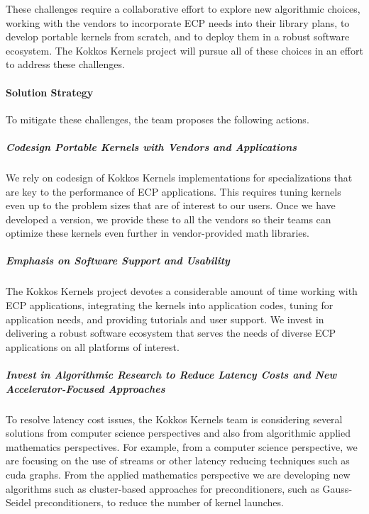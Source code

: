 These challenges require a collaborative effort to explore new algorithmic choices,
working with the vendors to incorporate ECP needs into their library plans, to develop
portable kernels from scratch, and to deploy them in a robust software ecosystem. The Kokkos
Kernels project will pursue all of these choices in an effort to address these challenges.

\paragraph{Solution Strategy}
To mitigate these challenges, the team proposes the following actions.


    \subparagraph{Codesign Portable Kernels with Vendors and Applications}
    We rely on codesign of Kokkos Kernels implementations for
    specializations that are key to the performance of ECP applications. This
    requires tuning kernels even up to the problem sizes that are of interest
    to our users. Once we have developed a version, we provide these
    to all the vendors so their teams can optimize these kernels even
    further in vendor-provided math libraries.
   \subparagraph{Emphasis on Software Support and Usability}
	The Kokkos Kernels project devotes a considerable amount of time working with
	ECP applications, integrating the kernels into application codes, tuning
	for application needs, and providing tutorials and user support. We invest
	in delivering a robust software ecosystem that serves the
	needs of diverse ECP applications on all platforms of interest.
   \subparagraph{Invest in Algorithmic Research to Reduce Latency Costs and New Accelerator-Focused Approaches} To resolve latency cost issues, the Kokkos Kernels team is considering several solutions from computer science perspectives and also from algorithmic applied mathematics perspectives. 
   For example, from a computer science perspective, we are focusing on the
   use of streams or other latency reducing techniques such as cuda graphs. From
   the applied mathematics perspective we are developing new algorithms such
   as cluster-based approaches for preconditioners, such as Gauss-Seidel preconditioners,
   to reduce the number of kernel launches. 


